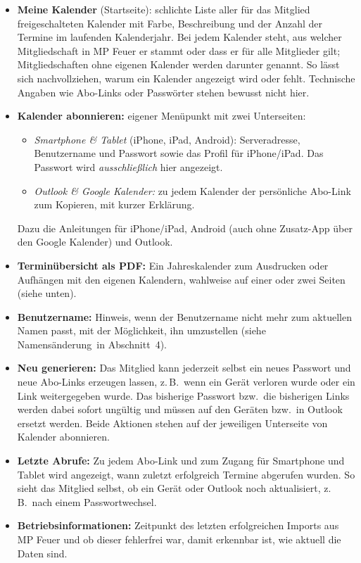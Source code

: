 \documentclass[a4paper,fontsize=10pt]{scrartcl}
\begin{document}
\begin{itemize}
  \item \textbf{Meine Kalender} (Startseite): schlichte Liste aller für das
        Mitglied freigeschalteten Kalender mit Farbe, Beschreibung und der
        Anzahl der Termine im laufenden Kalenderjahr. Bei jedem Kalender
        steht, aus welcher Mitgliedschaft in MP Feuer er stammt oder dass er
        für alle Mitglieder gilt; Mitgliedschaften ohne eigenen Kalender
        werden darunter genannt. So lässt sich nachvollziehen, warum ein
        Kalender angezeigt wird oder fehlt. Technische Angaben wie Abo-Links
        oder Passwörter stehen bewusst nicht hier.
  \item \textbf{Kalender abonnieren:} eigener Menüpunkt mit zwei
        Unterseiten:
        \begin{itemize}
          \item \emph{Smartphone \& Tablet} (iPhone, iPad, Android):
                Serveradresse, Benutzername und Passwort sowie das Profil für
                iPhone/iPad. Das Passwort wird \emph{ausschließlich} hier
                angezeigt.
          \item \emph{Outlook \& Google Kalender:} zu jedem Kalender der
                persönliche Abo-Link zum Kopieren, mit kurzer Erklärung.
        \end{itemize}
        Dazu die Anleitungen für iPhone/iPad, Android (auch ohne Zusatz-App
        über den Google Kalender) und Outlook.
  \item \textbf{Terminübersicht als PDF:} Ein Jahreskalender zum Ausdrucken
        oder Aufhängen mit den eigenen Kalendern, wahlweise auf einer oder
        zwei Seiten (siehe unten).
  \item \textbf{Benutzername:} Hinweis, wenn der Benutzername nicht mehr
        zum aktuellen Namen passt, mit der Möglichkeit, ihn umzustellen
        (siehe \glqq Namensänderung\grqq\ in Abschnitt~4).
  \item \textbf{Neu generieren:} Das Mitglied kann jederzeit selbst ein
        neues Passwort und neue Abo-Links erzeugen lassen, z.\,B.\ wenn ein
        Gerät verloren wurde oder ein Link weitergegeben wurde. Das bisherige
        Passwort bzw.\ die bisherigen Links werden dabei sofort ungültig und
        müssen auf den Geräten bzw.\ in Outlook ersetzt werden. Beide
        Aktionen stehen auf der jeweiligen Unterseite von \glqq Kalender
        abonnieren\grqq.
  \item \textbf{Letzte Abrufe:} Zu jedem Abo-Link und zum Zugang für
        Smartphone und Tablet wird angezeigt, wann zuletzt erfolgreich
        Termine abgerufen wurden. So sieht das Mitglied selbst, ob ein Gerät
        oder Outlook noch aktualisiert, z.\,B.\ nach einem Passwortwechsel.
  \item \textbf{Betriebsinformationen:} Zeitpunkt des letzten erfolgreichen
        Imports aus MP Feuer und ob dieser fehlerfrei war, damit erkennbar
        ist, wie aktuell die Daten sind.
\end{itemize}
\end{document}
